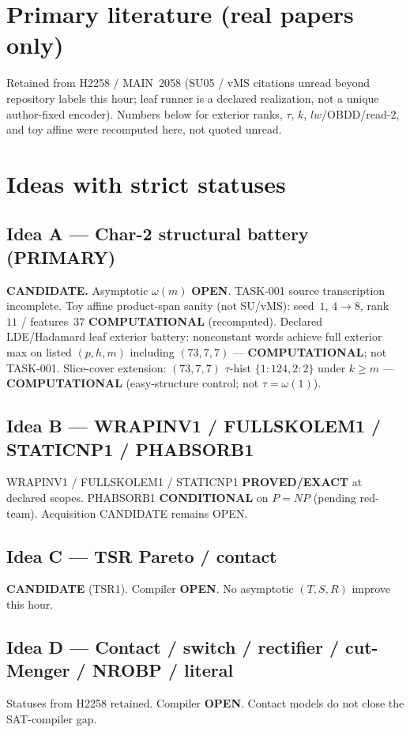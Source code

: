 \documentclass[11pt]{article}
\begin{document}
\section*{Primary literature (real papers only)}
Retained from H2258 / MAIN~2058 (SU05 / vMS citations unread beyond repository labels this hour;
leaf runner is a declared realization, not a unique author-fixed encoder).
Numbers below for exterior ranks, $\tau$, $k$, $lw$/OBDD/read-$2$, and toy affine
were recomputed here, not quoted unread.

\section*{Ideas with strict statuses}
\subsection*{Idea A --- Char-2 structural battery (PRIMARY)}
\textbf{CANDIDATE.} Asymptotic $\omega(m)$ \textbf{OPEN}. TASK-001 source transcription incomplete.
Toy affine product-span sanity (not SU/vMS): seed~$1$, $4\to8$, rank~$11$ / features~$37$
\textbf{COMPUTATIONAL} (recomputed).
Declared LDE/Hadamard leaf exterior battery: nonconstant words achieve full exterior max on
listed $(p,h,m)$ including $(73,7,7)$ --- \textbf{COMPUTATIONAL}; not TASK-001.
Slice-cover extension: $(73,7,7)$ $\tau$-hist $\{1{:}124,2{:}2\}$ under $k{\ge}m$ ---
\textbf{COMPUTATIONAL} (easy-structure control; not $\tau=\omega(1)$).

\subsection*{Idea B --- WRAPINV1 / FULLSKOLEM1 / STATICNP1 / PHABSORB1}
WRAPINV1 / FULLSKOLEM1 / STATICNP1 \textbf{PROVED/EXACT} at declared scopes.
PHABSORB1 \textbf{CONDITIONAL} on $P=NP$ (pending red-team). Acquisition CANDIDATE remains OPEN.

\subsection*{Idea C --- TSR Pareto / contact}
\textbf{CANDIDATE} (TSR1). Compiler \textbf{OPEN}. No asymptotic $(T,S,R)$ improve this hour.

\subsection*{Idea D --- Contact / switch / rectifier / cut-Menger / NROBP / literal}
Statuses from H2258 retained. Compiler \textbf{OPEN}. Contact models do not close the SAT-compiler gap.
\end{document}
